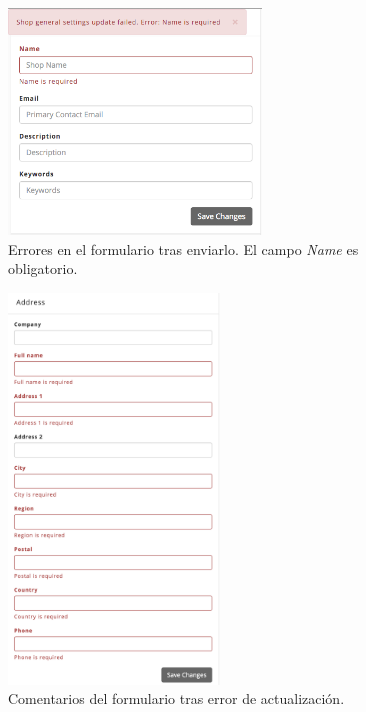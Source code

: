 
\begin{figure}[H]
	\centering
	\includegraphics[width=0.6\textwidth]{figuras/dashboard/ecommerce/general_menu/updated_error.png}
	\caption{Errores en el formulario tras enviarlo. El campo \textit{Name} es obligatorio.}
	\label{figure:apendice:dashboard:ecommerce:general_menu:updated_error}
\end{figure}

\begin{figure}[H]
	\centering
	\includegraphics[width=0.5\textwidth]{figuras/dashboard/ecommerce/address/updated_error.png}
	\caption{Comentarios del formulario tras error de actualización.}
	\label{figure:apendice:dashboard:ecommerce:address:updated_error}
\end{figure}

